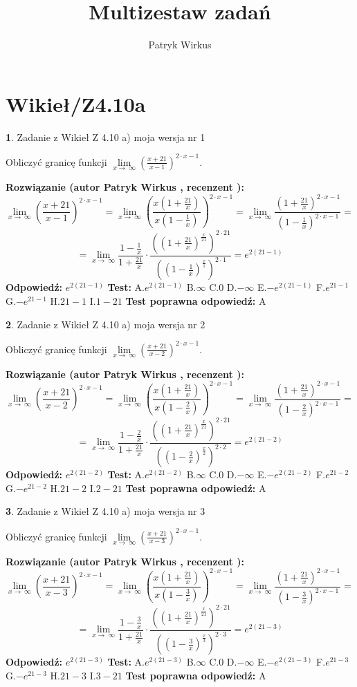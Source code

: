 \documentclass[12pt, a4paper]{article}
\title{Multizestaw zadań}
\author{Patryk Wirkus}
\date{}
\theoremstyle{definition} %
\newtheorem{zad}{}
\newcommand{\kategoria}[1]{\section{#1}}
\newcommand{\zadStart}[1]{\begin{zad}#1\newline}
\newcommand{\zadStop}{\end{zad}}
\newcommand{\rozwStart}[2]{\noindent \textbf{Rozwiązanie (autor #1 , recenzent #2): }\newline}
\newcommand{\rozwStop}{\newline}
\newcommand{\odpStart}{\noindent \textbf{Odpowiedź:}\newline}
\newcommand{\odpStop}{\newline}
\newcommand{\testStart}{\noindent \textbf{Test:}\newline}
\newcommand{\testStop}{\newline}
\newcommand{\kluczStart}{\noindent \textbf{Test poprawna odpowiedź:}\newline}
\newcommand{\kluczStop}{\newline}
\begin{document}
\maketitle

\kategoria{Wikieł/Z4.10a}


\zadStart{Zadanie z Wikieł Z 4.10 a) moja wersja nr 1}


Obliczyć granicę funkcji  $\lim\limits_{x\to\ \infty}(\frac{x+21}{x-1})^{2\cdot x-1}$.
\zadStop
\rozwStart{Patryk Wirkus}{}
$$\lim\limits_{x\to\ \infty}(\frac{x+21}{x-1})^{2\cdot x-1} = \lim\limits_{x\to\ \infty}(\frac{x(1+\frac{21}{x})}{x(1-\frac{1}{x})})^{2\cdot x-1}=\lim\limits_{x\to\ \infty}\frac{(1+\frac{21}{x})^{2\cdot x-1}}{(1-\frac{1}{x})^{2\cdot x-1}}=$$
$$=\lim\limits_{x\to\ \infty}\frac{1-\frac{1}{x}}{1+\frac{21}{x}}\cdot\frac{((1+\frac{21}{x})^{\frac{x}{21}})^{2\cdot21}}{((1-\frac{1}{x})^{\frac{x}{1}})^{2\cdot1}}=e^{2(21-1)}$$
\rozwStop
\odpStart
$e^{2(21-1)}$
\odpStop
\testStart
A.$e^{2(21-1)}$ B.$\infty$ C.$0$ D.$-\infty$ E.$-e^{2(21-1)}$
F.$e^{21-1}$ G.$-e^{21-1}$
H.$21-1$
I.$1-21$
\testStop
\kluczStart
A
\kluczStop



\zadStart{Zadanie z Wikieł Z 4.10 a) moja wersja nr 2}


Obliczyć granicę funkcji  $\lim\limits_{x\to\ \infty}(\frac{x+21}{x-2})^{2\cdot x-1}$.
\zadStop
\rozwStart{Patryk Wirkus}{}
$$\lim\limits_{x\to\ \infty}(\frac{x+21}{x-2})^{2\cdot x-1} = \lim\limits_{x\to\ \infty}(\frac{x(1+\frac{21}{x})}{x(1-\frac{2}{x})})^{2\cdot x-1}=\lim\limits_{x\to\ \infty}\frac{(1+\frac{21}{x})^{2\cdot x-1}}{(1-\frac{2}{x})^{2\cdot x-1}}=$$
$$=\lim\limits_{x\to\ \infty}\frac{1-\frac{2}{x}}{1+\frac{21}{x}}\cdot\frac{((1+\frac{21}{x})^{\frac{x}{21}})^{2\cdot21}}{((1-\frac{2}{x})^{\frac{x}{2}})^{2\cdot2}}=e^{2(21-2)}$$
\rozwStop
\odpStart
$e^{2(21-2)}$
\odpStop
\testStart
A.$e^{2(21-2)}$ B.$\infty$ C.$0$ D.$-\infty$ E.$-e^{2(21-2)}$
F.$e^{21-2}$ G.$-e^{21-2}$
H.$21-2$
I.$2-21$
\testStop
\kluczStart
A
\kluczStop



\zadStart{Zadanie z Wikieł Z 4.10 a) moja wersja nr 3}


Obliczyć granicę funkcji  $\lim\limits_{x\to\ \infty}(\frac{x+21}{x-3})^{2\cdot x-1}$.
\zadStop
\rozwStart{Patryk Wirkus}{}
$$\lim\limits_{x\to\ \infty}(\frac{x+21}{x-3})^{2\cdot x-1} = \lim\limits_{x\to\ \infty}(\frac{x(1+\frac{21}{x})}{x(1-\frac{3}{x})})^{2\cdot x-1}=\lim\limits_{x\to\ \infty}\frac{(1+\frac{21}{x})^{2\cdot x-1}}{(1-\frac{3}{x})^{2\cdot x-1}}=$$
$$=\lim\limits_{x\to\ \infty}\frac{1-\frac{3}{x}}{1+\frac{21}{x}}\cdot\frac{((1+\frac{21}{x})^{\frac{x}{21}})^{2\cdot21}}{((1-\frac{3}{x})^{\frac{x}{3}})^{2\cdot3}}=e^{2(21-3)}$$
\rozwStop
\odpStart
$e^{2(21-3)}$
\odpStop
\testStart
A.$e^{2(21-3)}$ B.$\infty$ C.$0$ D.$-\infty$ E.$-e^{2(21-3)}$
F.$e^{21-3}$ G.$-e^{21-3}$
H.$21-3$
I.$3-21$
\testStop
\kluczStart
A
\kluczStop
\end{document}
